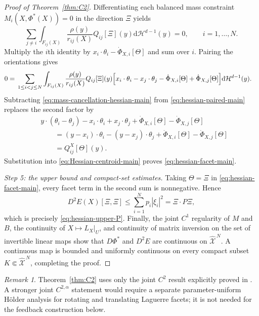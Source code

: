 \documentclass[11pt]{article}
\def\Xc{{\mathcal X}}
\def\hX{\widehat{\Xc}^{\,N}}
\newcommand{\dd}{\mathrm{d}}
\newcommand{\HH}{\mathcal H}
\theoremstyle{definition}
\theoremstyle{remark}
\newtheorem{remark}[theorem]{Remark}
\numberwithin{equation}{section}
\begin{document}
\begin{proof}[Proof of Theorem~\ref{thm:C2}]
Differentiating each balanced mass constraint
$M_i(X,\Phi^*(X))=0$ in the direction $\Xi$ yields
\begin{equation}\label{eq:linearized-mass-zero-main}
 \sum_{j\ne i}\int_{F_{ij}(X)}
 \frac{\rho(y)}{r_{ij}(X)}Q_{ij}[\Xi](y)\dd\HH^{d-1}(y)=0,
 \qquad i=1,\ldots,N.
\end{equation}
Multiply the $i$th identity by
$x_i\cdot\theta_i-\dot\Phi_{X,i}[\Theta]$ and sum over $i$.  Pairing the orientations gives
\begin{align}
 0={}&\sum_{1\le i<j\le N}\int_{F_{ij}(X)}\frac{\rho(y)}{r_{ij}(X)}Q_{ij}[\Xi](y)
 \Bigl[x_i\cdot\theta_i-x_j\cdot\theta_j
       -\dot\Phi_{X,i}[\Theta]+\dot\Phi_{X,j}[\Theta]\Bigr]
 \dd\HH^{d-1}(y).
 \label{eq:mass-cancellation-hessian-main}
\end{align}
Subtracting \eqref{eq:mass-cancellation-hessian-main} from
\eqref{eq:hessian-paired-main} replaces the second factor by
\begin{align*}
 &y\cdot(\theta_i-\theta_j)
 -x_i\cdot\theta_i+x_j\cdot\theta_j
 +\dot\Phi_{X,i}[\Theta]-\dot\Phi_{X,j}[\Theta]\\
 &\qquad=(y-x_i)\cdot\theta_i-(y-x_j)\cdot\theta_j
 +\dot\Phi_{X,i}[\Theta]-\dot\Phi_{X,j}[\Theta]\\
 &\qquad=Q_{ij}^X[\Theta](y).
\end{align*}
Substitution into \eqref{eq:Hessian-centroid-main} proves
\eqref{eq:hessian-facet-main}.

\medskip
\noindent\textit{Step 5: the upper bound and compact-set estimates.}
Taking $\Theta=\Xi$ in \eqref{eq:hessian-facet-main}, every facet term in the second sum is
nonnegative.  Hence
\[
 D^2E(X)[\Xi,\Xi]
 \le\sum_{i=1}^Np_i|\xi_i|^2=\Xi\cdot P\Xi,
\]
which is precisely \eqref{eq:hessian-upper-P}.  Finally, the joint $C^1$ regularity of $M$ and $B$,
the continuity of $X\mapsto L_X|_U$, and continuity of matrix inversion on the set of invertible
linear maps show that $D\Phi^*$ and $D^2E$ are continuous on $\hX$.  A continuous map is bounded and
uniformly continuous on every compact subset $K\Subset\hX$, completing the proof.
\end{proof}

\begin{remark}\label{rem:known-C2}
Theorem~\ref{thm:C2} uses only the joint $C^2$ result explicitly proved in
\cite{deGournayKahnLebrat2019}.  A stronger joint $C^{2,\alpha}$ statement would require a separate
parameter-uniform H\"older analysis for rotating and translating Laguerre facets; it is not needed
for the feedback construction below.
\end{remark}
\end{document}
